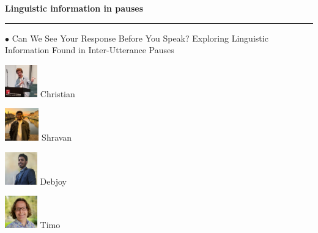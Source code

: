 \documentclass[aspectratio=169]{beamer}
\begin{document}
\begin{frame}[fragile]
    \begin{minipage}{1.0\textwidth}
        \begin{minipage}{.55\textwidth}
            \textbf{Linguistic information in pauses}
            \par\noindent\rule{\textwidth}{0.4pt}
            {\color{thiscolor}$\bullet$} Can We See Your Response Before You Speak? Exploring Linguistic Information Found in Inter-Utterance Pauses 
            \\ \citep{schuler2024CanWeSee}
        \end{minipage}
        \begin{minipage}{.44\textwidth}
            \centering
            \begin{minipage}{.24\textwidth}
                \centering
                \includegraphics[height=1.4cm]{images/Christian_Schuler_Lecture.jpg} 
                Christian
            \end{minipage}%
            \begin{minipage}{.24\textwidth}
                \centering
                \includegraphics[height=1.4cm]{images/Shravan_Nayak.jpg}
                Shravan
            \end{minipage}%
            \begin{minipage}{.24\textwidth}
                \centering
                \includegraphics[height=1.4cm]{images/Debjoy_Saha.png}
                Debjoy
            \end{minipage}%
            \begin{minipage}{.24\textwidth}
                \centering
                \includegraphics[height=1.4cm]{images/Timo_Baumann.jpg}
                Timo

\end{minipage}
\end{minipage}
\end{minipage}
\end{frame}
\end{document}
